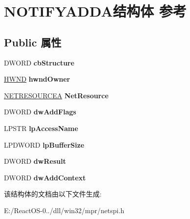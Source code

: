 \hypertarget{struct_n_o_t_i_f_y_a_d_d_a}{}\section{N\+O\+T\+I\+F\+Y\+A\+D\+D\+A结构体 参考}
\label{struct_n_o_t_i_f_y_a_d_d_a}
\subsection*{Public 属性}
\begin{DoxyCompactItemize}
\item 
\mbox{\label{struct_n_o_t_i_f_y_a_d_d_a_a462dce3d9936e46825a854ab8b2f43fd}} 
D\+W\+O\+RD {\bfseries cb\+Structure}
\item 
\mbox{\label{struct_n_o_t_i_f_y_a_d_d_a_a82aa71fe56ba42b88687d6dd1413aa54}} 
\hyperlink{interfacevoid}{H\+W\+ND} {\bfseries hwnd\+Owner}
\item 
\mbox{\label{struct_n_o_t_i_f_y_a_d_d_a_aec576624411e35cb2c6b8cc3491cbc94}} 
\hyperlink{struct___n_e_t_r_e_s_o_u_r_c_e_a}{N\+E\+T\+R\+E\+S\+O\+U\+R\+C\+EA} {\bfseries Net\+Resource}
\item 
\mbox{\label{struct_n_o_t_i_f_y_a_d_d_a_a9627dd90911a46a50a49e253723ba806}} 
D\+W\+O\+RD {\bfseries dw\+Add\+Flags}
\item 
\mbox{\label{struct_n_o_t_i_f_y_a_d_d_a_aa1181e1aaadae3ea2ca81bd9b47fec55}} 
L\+P\+S\+TR {\bfseries lp\+Access\+Name}
\item 
\mbox{\label{struct_n_o_t_i_f_y_a_d_d_a_ad8649657e480982cea273972c421d5a5}} 
L\+P\+D\+W\+O\+RD {\bfseries lp\+Buffer\+Size}
\item 
\mbox{\label{struct_n_o_t_i_f_y_a_d_d_a_a10e6f04e426557128b5caa167d9c5cd1}} 
D\+W\+O\+RD {\bfseries dw\+Result}
\item 
\mbox{\label{struct_n_o_t_i_f_y_a_d_d_a_ad720e84becb17267de8250132794496d}} 
D\+W\+O\+RD {\bfseries dw\+Add\+Context}
\end{DoxyCompactItemize}


该结构体的文档由以下文件生成\+:\begin{DoxyCompactItemize}
\item 
E\+:/\+React\+O\+S-\/0../dll/win32/mpr/netspi.\+h\end{DoxyCompactItemize}
